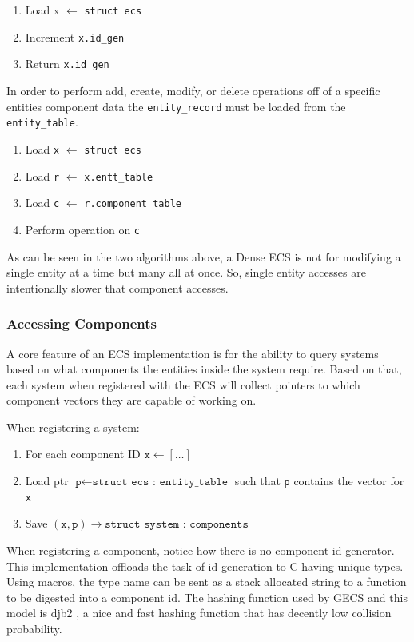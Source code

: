 \begin{enumerate}
    \item Load x \(\leftarrow\) \texttt{struct ecs}
    \item Increment \texttt{x.id\_gen}
    \item Return \texttt{x.id\_gen}
\end{enumerate}

In order to perform add, create, modify, or delete operations off of a specific entities component data the \texttt{entity\_record} must be loaded from the \texttt{entity\_table}.

\begin{enumerate}
    \item Load \texttt{x} \(\leftarrow\) \texttt{struct ecs}
    \item Load \texttt{r} \(\leftarrow\) \texttt{x.entt\_table}
    \item Load \texttt{c} \(\leftarrow\) \texttt{r.component\_table}
    \item Perform operation on \texttt{c}
\end{enumerate}

As can be seen in the two algorithms above, a Dense ECS is not for modifying a single entity at a time but many all at once. So, single entity accesses are intentionally slower that component accesses. \cite{EnTT_SparseSets}

\subsubsection{Accessing Components}
A core feature of an ECS implementation is for the ability to query systems based on what components the entities inside the system require. Based on that, each system when registered with the ECS will collect pointers to which component vectors they
are capable of working on. 

When registering a system:
\begin{enumerate}
    \item For each component ID \( \texttt{x} \leftarrow [\ldots] \)
    \item Load ptr \( \texttt{p} \leftarrow \texttt{struct ecs : entity\_table} \) such that \texttt{p} contains the vector for \texttt{x}
    \item Save $(\texttt{x}, \texttt{p}) \rightarrow \texttt{struct system : components}$
\end{enumerate}


When registering a component, notice how there is no component id generator. This implementation offloads the task of id
generation to C having unique types. Using macros, the type name can be sent as a stack allocated string to a function to be digested into a component id. The hashing function used by GECS and this model is djb2 \cite{hashing}, a nice and fast hashing function that has decently low collision probability.

